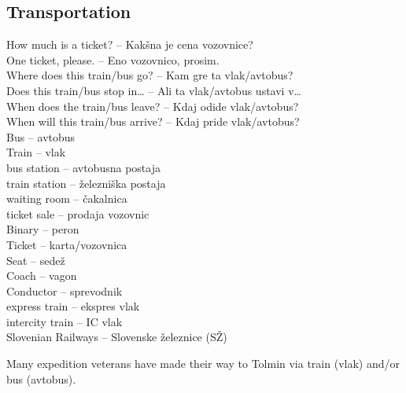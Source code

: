 \subsection{Transportation}

How much is a ticket? -- Kakšna je cena vozovnice?\\
One ticket, please. -- Eno vozovnico, prosim.\\
Where does this train/bus go? -- Kam gre ta vlak/avtobus?\\
Does this train/bus stop in\ldots{} -- Ali ta vlak/avtobus ustavi v\ldots{}\\
When does the train/bus leave? -- Kdaj odide vlak/avtobus?\\
When will this train/bus arrive? -- Kdaj pride vlak/avtobus?\\
Bus -- avtobus\\ 
Train -- vlak\\
bus station -- avtobusna postaja\\
train station -- železniška postaja\\
waiting room -- čakalnica\\
ticket sale -- prodaja vozovnic\\
Binary -- peron\\
Ticket -- karta/vozovnica\\
Seat -- sedež\\
Coach -- vagon\\
Conductor -- sprevodnik\\
express train -- ekspres vlak\\
intercity train -- IC vlak\\
Slovenian Railways -- Slovenske železnice (SŽ)\\

\begin{marginfigure}
\checkoddpage \ifoddpage \forcerectofloat \else \forceversofloat \fi
\centering
 \caption{Many expedition veterans have made their way to Tolmin via train (vlak) and/or bus (avtobus). }
 \label{Thara train}
\end{marginfigure}



